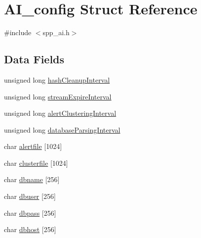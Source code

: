 \hypertarget{structAI__config}{
\section{AI\_\-config Struct Reference}
\label{structAI__config}
}


{\ttfamily \#include $<$spp\_\-ai.h$>$}

\subsection*{Data Fields}
\begin{DoxyCompactItemize}
\item 
unsigned long \hyperlink{structAI__config_a9f7680615027d4fb74b4aa144a7028a4}{hashCleanupInterval}
\item 
unsigned long \hyperlink{structAI__config_abbe77d5f94b8c5164bea47acba09c98b}{streamExpireInterval}
\item 
unsigned long \hyperlink{structAI__config_a7d0d098b8263aa3d8415b11d1ec7f93d}{alertClusteringInterval}
\item 
unsigned long \hyperlink{structAI__config_ae6ca715cab1d90b70c3aad443133c263}{databaseParsingInterval}
\item 
char \hyperlink{structAI__config_a2efa9590d7eea6dce8b5dd9aa76ed8ca}{alertfile} \mbox{[}1024\mbox{]}
\item 
char \hyperlink{structAI__config_a6da02a3f7116fd3810a41b738e8883a3}{clusterfile} \mbox{[}1024\mbox{]}
\item 
char \hyperlink{structAI__config_ac8a93607f12106e2f5c9b43af27107da}{dbname} \mbox{[}256\mbox{]}
\item 
char \hyperlink{structAI__config_aa004adebfdafb6d14092aecd7f4912b0}{dbuser} \mbox{[}256\mbox{]}
\item 
char \hyperlink{structAI__config_aa1cda349763faf60b2ebdbf2d187ae7d}{dbpass} \mbox{[}256\mbox{]}
\item 
char \hyperlink{structAI__config_a8e56f1a1b2095d3d329c8068ea0f3aab}{dbhost} \mbox{[}256\mbox{]}
\end{DoxyCompactItemize}


